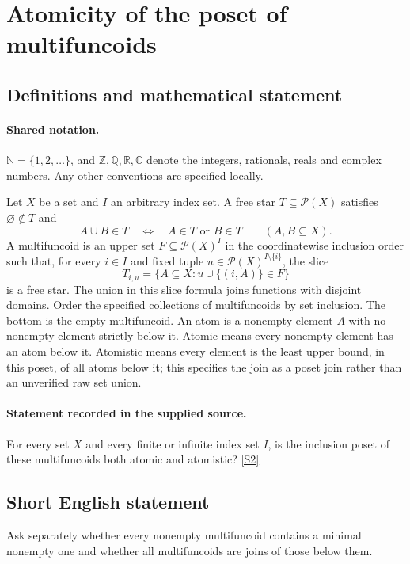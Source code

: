 \documentclass[11pt]{article}
\newcommand{\sref}[2]{\hyperlink{source:#1:#2}{[S#2]}}
\begin{document}
\section{Atomicity of the poset of multifuncoids}\label{statement}

\subsection{Definitions and mathematical statement}

\paragraph{Shared notation.}$\mathbb N=\{1,2,\ldots\}$, and $\mathbb Z,\mathbb Q,\mathbb R,\mathbb C$ denote the integers, rationals, reals and complex numbers. Any other conventions are specified locally.


Let $X$ be a set and $I$ an arbitrary index set. A free star $T\subseteq\mathcal P(X)$ satisfies $\varnothing\notin T$ and
\[
 A\cup B\in T\quad\Longleftrightarrow\quad A\in T\text{ or }B\in T
 \qquad(A,B\subseteq X).
\]
A multifuncoid is an upper set $F\subseteq\mathcal P(X)^I$ in the coordinatewise inclusion order such that, for every $i\in I$ and fixed tuple $u\in\mathcal P(X)^{I\setminus\{i\}}$, the slice
\[
 T_{i,u}=\{A\subseteq X:u\cup\{(i,A)\}\in F\}
\]
is a free star. The union in this slice formula joins functions with disjoint domains.
Order the specified collections of multifuncoids by set inclusion. The bottom is the empty multifuncoid. An atom is a nonempty element $A$ with no nonempty element strictly below it. Atomic means every nonempty element has an atom below it. Atomistic means every element is the least upper bound, in this poset, of all atoms below it; this specifies the join as a poset join rather than an unverified raw set union.
\paragraph{Statement recorded in the supplied source.}
For every set $X$ and every finite or infinite index set $I$, is the inclusion poset of these multifuncoids both atomic and atomistic? \sref{statement}{2}
\subsection{Short English statement}
Ask separately whether every nonempty multifuncoid contains a minimal nonempty one and whether all multifuncoids are joins of those below them.
\end{document}
